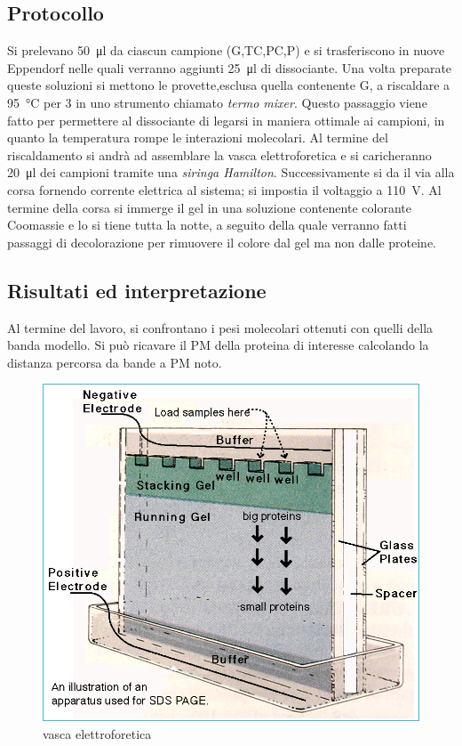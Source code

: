 \documentclass[twocolumn,a4paper,10pt]{my_report}
\begin{document}
{\subsection*{Protocollo}
Si prelevano \SI{50}{\ul} da ciascun campione (G,TC,PC,P) e si trasferiscono in nuove Eppendorf nelle quali verranno aggiunti \SI{25}{\ul} di dissociante.
Una volta preparate queste soluzioni si mettono le provette,esclusa quella contenente G, a riscaldare a \SI{95}{\celsius} per \SI{3}{} in uno strumento chiamato \emph{termo mixer}.
Questo passaggio viene fatto per permettere al dissociante di legarsi in maniera ottimale ai campioni, in quanto la temperatura rompe le interazioni molecolari.
Al termine del riscaldamento si andrà ad assemblare la vasca elettroforetica e si caricheranno \SI{20}{\ul} dei campioni tramite una \emph{siringa Hamilton}.
Successivamente si da il via alla corsa fornendo corrente elettrica al sistema; si impostia il voltaggio a \SI{110}{\volt}.
Al termine della corsa si immerge il gel in una soluzione contenente colorante Coomassie e lo si tiene tutta la notte, a seguito della quale verranno fatti passaggi di decolorazione per rimuovere il colore dal gel ma non dalle proteine.



\subsection*{Risultati ed interpretazione}
Al termine del lavoro, si confrontano i pesi molecolari ottenuti con quelli della banda modello. Si può ricavare il PM della proteina di interesse calcolando la distanza percorsa da bande a PM noto.
\begin{figure}[htbp]
\centering
\includegraphics[width=0.8\linewidth]{gel.jpg}
\caption{vasca elettroforetica}
\label{fig:GEL}
\end{figure}

}
\end{document}
